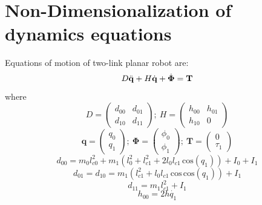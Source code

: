 \documentclass[conference]{IEEEtran}
\begin{document}
\section{Non-Dimensionalization of dynamics equations}
Equations of motion of two-link planar robot are:
\begin{equation}\label{eq1}
    D\Ddot{\mathbf{q}} + H\dot{\mathbf{q}} + \dot{\mathbf{\Phi}} = \textbf{T}
\end{equation}
where
\begin{equation}\label{eq2}
    D = 
    \left( \begin{array}{cc}
    d_{00} & d_{01} \\
    d_{10} & d_{11}
    \end{array} \right)
    ;~H = 
    \left( \begin{array}{cc}
    h_{00} & h_{01} \\
    h_{10} & 0
    \end{array} \right)
\end{equation}
\begin{equation}\label{eq3}
    \mathbf{q} = 
    \left( \begin{array}{cc}
    q_{0} \\
    q_{1}
    \end{array} \right)
    ;~\mathbf{\Phi} = 
    \left( \begin{array}{c}
    \phi_{0} \\
    \phi_{1}
    \end{array} \right)
    ;~\mathbf{T} = 
    \left( \begin{array}{c}
    0 \\
    \tau_{1}
    \end{array} \right)
\end{equation}
\begin{equation}\label{eq4}
    d_{00} = m_0l_{c0}^{2} + m_1(l_0^2+l_{c1}^2+2l_0l_{c1}\,\text{cos}(q_1))+I_0+I_1
\end{equation}
\begin{equation}\label{eq5}
    d_{01} = d_{10} = m_1(l_{c1}^2+l_0l_{c1}\,\text{cos}\,\text{cos}(q_1))+I_1
\end{equation}
\begin{equation}\label{eq6}
    d_{11} = m_1l_{c1}^{2} + I_1
\end{equation}
\begin{equation}\label{eq7}
    h_{00} = 2h\dot{q_1}
\end{equation}
\end{document}
